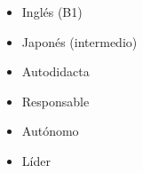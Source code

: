 %
%
%

\twocolumnsection
{
\vspace{1em}
\begin{itemize}
    \item Inglés (B1)
    \item Japonés (intermedio)
\end{itemize}
}
{
\vspace{1em}
\begin{itemize}
    \item Autodidacta
    \item Responsable
    \item Autónomo
    \item Líder
\end{itemize}
}